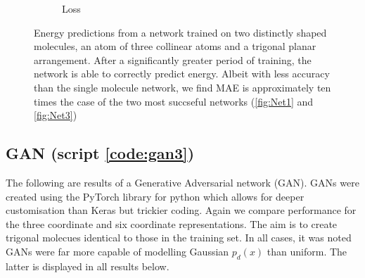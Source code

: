 \documentclass[12pt,a4paper]{article}
\begin{document}
\begin{figure}[!h]
\begin{subfigure}[t]{0.49\textwidth}
    \caption{Loss}
    \label{fig:5sub2}
\end{subfigure}
\caption{Energy predictions from a network trained on two distinctly shaped molecules, an atom of three collinear atoms and a trigonal planar arrangement. After a significantly greater period of training, the network is able to correctly predict energy. Albeit with less accuracy than the single molecule network, we find MAE is approximately ten times the case of the two most succseful networks (\ref{fig:Net1} and \ref{fig:Net3})}
\label{fig:shapes}
\end{figure}
%
\subsection{GAN (script \ref{code:gan3})}
The following are results of a Generative Adversarial network (GAN). GANs were created using the PyTorch \cite{noauthor_pytorch_nodate} library for python which allows for deeper customisation than Keras but trickier coding. Again we compare performance for the three coordinate and six coordinate representations. The aim is to create trigonal molecues identical to those in the training set. In all cases, it was noted GANs were far more capable of modelling Gaussian $p_d(x)$ than uniform. The latter is displayed in all results below. 
\end{document}
